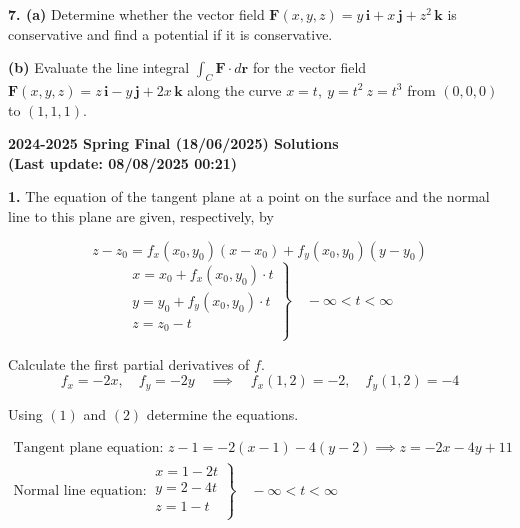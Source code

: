\documentclass{article}
\begin{document}
\vspace{1em}

\textbf{7. (a)} Determine whether the vector field $\mathbf{F}(x,y,z)=y\,\mathbf{i}+x\,\mathbf{j}+z^2\,\mathbf{k}$ is conservative and find a potential if it is conservative.

\textbf{(b)} Evaluate the line integral $\int_C\mathbf{F}\cdot d\mathbf{r}$ for the vector field $\mathbf{F}(x,y,z)=z\,\mathbf{i}-y\,\mathbf{j}+2x\,\mathbf{k}$ along the curve $x=t,\:y=t^2\:z=t^3$ from $(0,0,0)$ to $(1,1,1)$.

\newpage

\begin{center}
\textbf{2024-2025 Spring Final (18/06/2025) Solutions\\
(Last update: 08/08/2025 00:21)}
\end{center}

\textbf{1.} The equation of the tangent plane at a point on the surface and the normal line to this plane are given, respectively, by

\begin{equation}z-z_0=f_x(x_0,y_0)(x-x_0)+f_y(x_0,y_0)(y-y_0)\end{equation}
\begin{equation}
\left.\begin{array}{c}
x=x_0+f_x(x_0,y_0)\cdot t\\
y=y_0+f_y(x_0,y_0)\cdot t\\
z=z_0- t\\
\end{array}\right\}\quad-\infty<t<\infty
\end{equation}

Calculate the first partial derivatives of $f$.
\[f_x=-2x,\quad f_y=-2y\quad\implies\quad f_x(1,2)=-2,\quad f_y(1,2)=-4\]

Using $(1)$ and $(2)$ determine the equations.

\[\boxed{\begin{array}{l}
\text{Tangent plane equation: } z-1=-2(x-1)-4(y-2)\implies z=-2x-4y+11\\[1em]
\text{Normal line equation:}\:\left.\begin{array}{l}
x=1-2t\\
y=2-4t\\
z=1-t\\
\end{array}\right\}\quad-\infty<t<\infty
\end{array}
}
\]

\vspace{1em}
\end{document}
